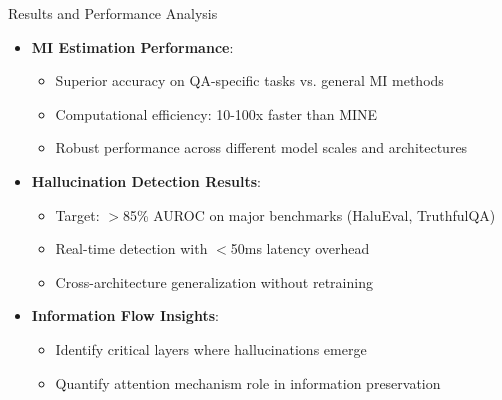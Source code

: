 \documentclass[aspectratio=169]{beamer}
\begin{document}
\begin{frame}{Results and Performance Analysis}
\begin{itemize}
    \item \textbf{MI Estimation Performance}:
    \begin{itemize}
        \item Superior accuracy on QA-specific tasks vs. general MI methods
        \item Computational efficiency: 10-100x faster than MINE \citep{belghazi2018mutual}
        \item Robust performance across different model scales and architectures
    \end{itemize}
    \item \textbf{Hallucination Detection Results}:
    \begin{itemize}
        \item Target: $>$85\% AUROC on major benchmarks (HaluEval, TruthfulQA)
        \item Real-time detection with $<$50ms latency overhead
        \item Cross-architecture generalization without retraining
    \end{itemize}
    \item \textbf{Information Flow Insights}:
    \begin{itemize}
        \item Identify critical layers where hallucinations emerge
        \item Quantify attention mechanism role in information preservation
    \end{itemize}
\end{itemize}
\end{frame}
\end{document}
